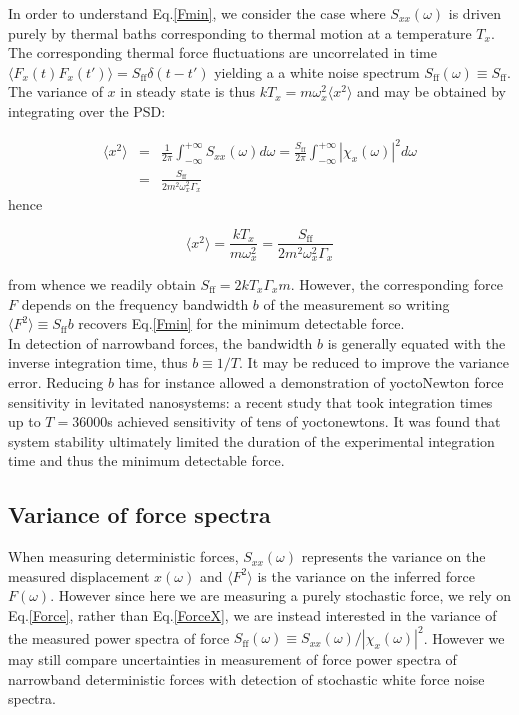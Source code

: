 \documentclass[twocolumn,english,notitlepage,superscriptaddress,nofootinbib]{revtex4-2}
\begin{document}
In order to understand Eq.\ref{Fmin},    we consider the case where $S_{xx}(\omega)$  is driven purely by thermal
baths corresponding to thermal motion at a temperature $T_x$.  The corresponding thermal
force fluctuations are uncorrelated in time $\langle F_x(t)F_x(t')\rangle= S_{\text{ff}} \delta(t-t')$   yielding a
  a white noise  spectrum $S_{\text{ff}}(\omega) \equiv S_{\text{ff}}$.
 The variance of $x$ in steady state is thus $k T_x = m\omega_x^2 \langle x^2\rangle$ and may be obtained
  by integrating over the PSD:

\begin{eqnarray}
\langle x^2\rangle & =& \frac{1}{2\pi} \int_{-\infty}^{+\infty} S_{xx}(\omega) d\omega =  \frac{S_{\text{ff}} }{2\pi} \int_{-\infty}^{+\infty} |\chi_x(\omega)|^2 d\omega \nonumber \\
&= & \frac{S_{\text{ff}} }{2m^2\omega_x^2 \Gamma_x}
\end{eqnarray}
hence

\begin{equation}
 \langle x^2\rangle= \frac{kT_x}{m\omega_x^2}=  \frac{S_{\text{ff}}}{2m^2 \omega_x^2 \Gamma_x}
\end{equation}

from whence we readily obtain  $S_{\text{ff}}= 2 k T_x \Gamma_x m$.
However, the corresponding  force $F$ depends on the frequency bandwidth $b$ of the measurement so
writing $\langle F^2\rangle \equiv  S_{\text{ff}} b$ recovers Eq.\ref{Fmin} for the minimum detectable force.\\
 In  detection of narrowband forces,  the bandwidth $b$ is generally  equated with the inverse integration time,  thus  $b\equiv 1/T$.   It may be reduced to improve the variance error.  Reducing $b$ has for instance allowed a demonstration of  yoctoNewton force sensitivity in levitated nanosystems:  a recent study that took integration times up to $T=36 000$s \cite{liang2023yoctonewton}  achieved sensitivity of tens of yoctonewtons.  It was found that system stability ultimately limited the duration of the experimental integration time and thus the minimum detectable force. 



\subsection{Variance of force spectra }

When measuring deterministic forces,  $S_{xx}(\omega)$ represents the variance on the measured displacement $x(\omega)$ and  $ \langle F^2\rangle$ is the variance on the inferred force $F(\omega)$.   However since here we are measuring a purely stochastic force,  we rely on Eq.\ref{Force},  rather than 
Eq.\ref{ForceX},  we are  instead interested in the variance of the measured  power spectra  of force $S_{\text{ff}} (\omega) \equiv S_{xx}(\omega)/|\chi_x(\omega)|^2$.   However we may still compare uncertainties in measurement of force power spectra of narrowband deterministic forces with detection of stochastic white force noise  spectra.\\
\end{document}
